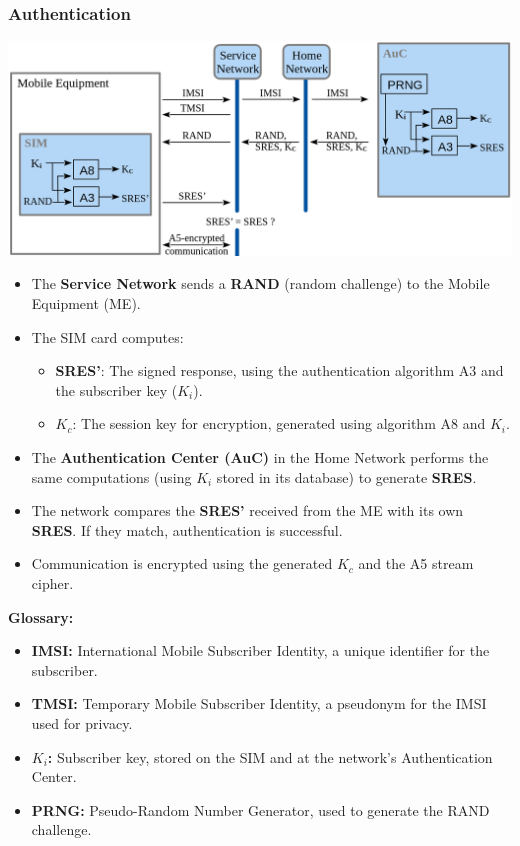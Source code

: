 \subsubsection{Authentication}
\includegraphics[width=0.9\columnwidth]{Resources/gsm_auth.png} %
\begin{itemize}
    \item The \textbf{Service Network} sends a \textbf{RAND} (random challenge) to the Mobile Equipment (ME).
    \item The SIM card computes:
    \begin{itemize}
        \item \textbf{SRES'}: The signed response, using the authentication algorithm A3 and the subscriber key (\(K_i\)).
        \item \textbf{\(K_c\)}: The session key for encryption, generated using algorithm A8 and \(K_i\).
    \end{itemize}
    \item The \textbf{Authentication Center (AuC)} in the Home Network performs the same computations (using \(K_i\) stored in its database) to generate \textbf{SRES}.
    \item The network compares the \textbf{SRES'} received from the ME with its own \textbf{SRES}. If they match, authentication is successful.
    \item Communication is encrypted using the generated \textbf{\(K_c\)} and the A5 stream cipher.
\end{itemize}
\textbf{Glossary:}
\begin{itemize}
    \item \textbf{IMSI:} International Mobile Subscriber Identity, a unique identifier for the subscriber.
    \item \textbf{TMSI:} Temporary Mobile Subscriber Identity, a pseudonym for the IMSI used for privacy.
    \item \textbf{\(K_i\):} Subscriber key, stored on the SIM and at the network's Authentication Center.
    \item \textbf{PRNG:} Pseudo-Random Number Generator, used to generate the RAND challenge.
\end{itemize}

